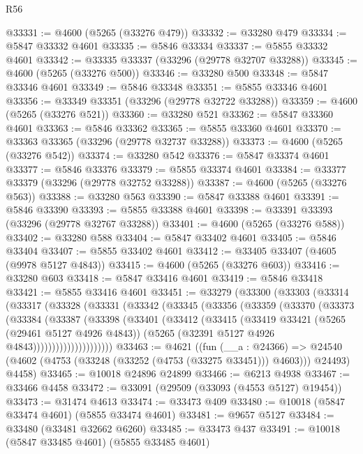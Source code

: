 \begin{lexlean}{R56}
\begin{coremodule}
@33331 := @4600 (@5265 (@33276 @479))
@33332 := @33280 @479
@33334 := @5847 @33332 @4601
@33335 := @5846 @33334
@33337 := @5855 @33332 @4601
@33342 := @33335 @33337 (@33296 (@29778 @32707 @33288))
@33345 := @4600 (@5265 (@33276 @500))
@33346 := @33280 @500
@33348 := @5847 @33346 @4601
@33349 := @5846 @33348
@33351 := @5855 @33346 @4601
@33356 := @33349 @33351 (@33296 (@29778 @32722 @33288))
@33359 := @4600 (@5265 (@33276 @521))
@33360 := @33280 @521
@33362 := @5847 @33360 @4601
@33363 := @5846 @33362
@33365 := @5855 @33360 @4601
@33370 := @33363 @33365 (@33296 (@29778 @32737 @33288))
@33373 := @4600 (@5265 (@33276 @542))
@33374 := @33280 @542
@33376 := @5847 @33374 @4601
@33377 := @5846 @33376
@33379 := @5855 @33374 @4601
@33384 := @33377 @33379 (@33296 (@29778 @32752 @33288))
@33387 := @4600 (@5265 (@33276 @563))
@33388 := @33280 @563
@33390 := @5847 @33388 @4601
@33391 := @5846 @33390
@33393 := @5855 @33388 @4601
@33398 := @33391 @33393 (@33296 (@29778 @32767 @33288))
@33401 := @4600 (@5265 (@33276 @588))
@33402 := @33280 @588
@33404 := @5847 @33402 @4601
@33405 := @5846 @33404
@33407 := @5855 @33402 @4601
@33412 := @33405 @33407 (@4605 (@9978 @5127 @4843))
@33415 := @4600 (@5265 (@33276 @603))
@33416 := @33280 @603
@33418 := @5847 @33416 @4601
@33419 := @5846 @33418
@33421 := @5855 @33416 @4601
@33451 := @33279
    (@33300
      (@33303
        (@33314
          (@33317
            (@33328
              (@33331
                (@33342
                  (@33345
                    (@33356
                      (@33359
                        (@33370
                          (@33373
                            (@33384
                              (@33387
                                (@33398
                                  (@33401
                                    (@33412
                                      (@33415
                                        (@33419
                                          @33421
                                          (@5265 (@29461 @5127 @4926 @4843))
                                          (@5265 (@32391 @5127 @4926 @4843)))))))))))))))))))))
@33463 := @4621
    ((fun (__a : @24366) =>
    @24540 (@4602 (@4753 (@33248 (@33252 (@4753 (@33275 @33451))) @4603))) @24493)
      @4458)
@33465 := @10018 @24896 @24899
@33466 := @6213 @4938
@33467 := @33466 @4458
@33472 := @33091 (@29509 (@33093 (@4553 @5127) @19454))
@33473 := @31474 @4613
@33474 := @33473 @409
@33480 := @10018 (@5847 @33474 @4601) (@5855 @33474 @4601)
@33481 := @9657 @5127
@33484 := @33480 (@33481 @32662 @6260)
@33485 := @33473 @437
@33491 := @10018 (@5847 @33485 @4601) (@5855 @33485 @4601)

\end{coremodule}
\end{lexlean}
